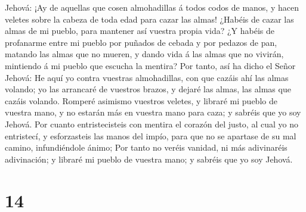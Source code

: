 Jehová: ¡Ay de aquellas que cosen almohadillas á todos codos de manos, y
hacen veletes sobre la cabeza de toda edad para cazar las almas! ¿Habéis
de cazar las almas de mi pueblo, para mantener así vuestra propia vida?
 ¿Y habéis de profanarme entre mi pueblo por puñados de
cebada y por pedazos de pan, matando las almas que no mueren, y dando
vida á las almas que no vivirán, mintiendo á mi pueblo que escucha la
mentira?  Por tanto, así ha dicho el Señor Jehová: He
aquí yo contra vuestras almohadillas, con que cazáis ahí las almas
volando; yo las arrancaré de vuestros brazos, y dejaré las almas, las
almas que cazáis volando.  Romperé asimismo vuestros
veletes, y libraré mi pueblo de vuestra mano, y no estarán más en
vuestra mano para caza; y sabréis que yo soy Jehová.  Por
cuanto entristecisteis con mentira el corazón del justo, al cual yo no
entristecí, y esforzasteis las manos del impío, para que no se apartase
de su mal camino, infundiéndole ánimo;  Por tanto no
veréis vanidad, ni más adivinaréis adivinación; y libraré mi pueblo de
vuestra mano; y sabréis que yo soy Jehová.

\hypertarget{section-13}{%
\section{14}\label{section-13}}

